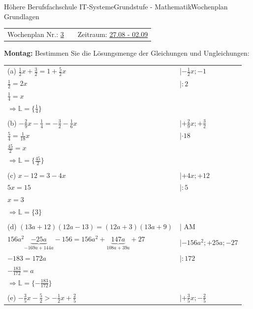 \documentclass[oneside,openany,headings=optiontotoc,11pt,numbers=noenddot]{scrreprt}
\begin{document}
	\begin{worksheet}{Höhere Berufsfachschule IT-Systeme}{Grundstufe - Mathematik}{Wochenplan Grundlagen}
		\noindent
		\begin{tabularx}{\textwidth}{XXl}
			Wochenplan Nr.: \underline{    3    } & & Zeitraum: \underline{27.08 - 02.09}
		\end{tabularx}
	
		\begin{framed}
			\noindent
			\textbf{Montag:}  Bestimmen Sie die Lösungsmenge der Gleichungen und Ungleichungen:\\
			\begin{tabularx}{\textwidth}{ll}
				\\
				(a) \(\frac{1}{2}x + \frac{3}{2} = 1 + \frac{5}{2}x\) & |\(-\frac{1}{2}x; -1\)\\
				\(\frac{1}{2} = 2x\) & |\(:2\)\\
				\(\frac{1}{4} = x\)\\
				\(\Rightarrow \mathbb{L} = \{\frac{1}{4}\}\)\\
				\\
				(b) \(-\frac{2}{9}x - \frac{1}{4} = -\frac{3}{2}-\frac{1}{6}x\) & |\(+\frac{2}{9}x; +\frac{3}{2}\)\\
				\(\frac{5}{4} = \frac{1}{18}x\) & |\(\cdot{}18\)\\
				\(\frac{45}{2} = x\)\\
				\(\Rightarrow \mathbb{L} = \{\frac{45}{2}\}\)\\
				\\
				(c) \(x-12 = 3-4x\) & |\(+4x; +12\)\\
				\(5x = 15\) & |\(:5\)\\
				\(x = 3\)\\
				\(\Rightarrow \mathbb{L}=\{3\}\)\\
				\\
				(d) \((13a+12)(12a-13) = (12a+3)(13a+9)\) & | AM\\
				\(156a^2 \underbrace{-25a}_{-169a + 144a} -156 = 156a^2 + \underbrace{147a}_{108a +39a} +27\) & |\(-156a^2; +25a; -27\)\\
				\(-183 = 172a\) & |\(:172\)\\
				\(-\frac{183}{172} = a\)\\
				\(\Rightarrow \mathbb{L} = \{-\frac{183}{172}\}\)\\
				\\
				(e) \(-\frac{3}{5}x-\frac{5}{2} > -\frac{1}{2}x + \frac{2}{5}\) & |\(+\frac{3}{5}x; -\frac{2}{5}\)\\

\end{tabularx}
\end{framed}
\end{worksheet}
\end{document}
